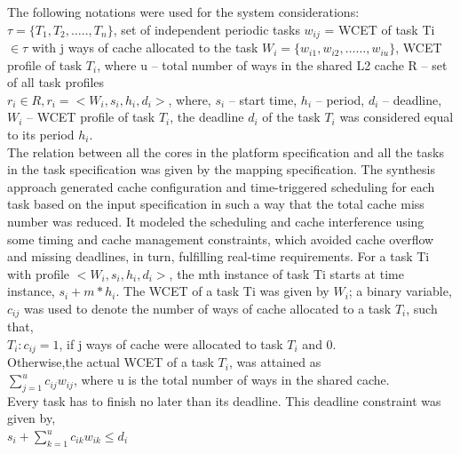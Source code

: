 \documentclass[conference]{IEEEtran}
\begin{document}
    The following notations were used for the system considerations:\\
    \newline
    $\tau = \{ T_1,  T_2, ….., T_n \}$, set of independent periodic tasks\break
    \newline
    $w_{ij}$ = WCET of task Ti $\in \tau$ with j ways of cache allocated to the task\break
    \newline
    $W_i = \{ w_{i1}, w_{i2}, ……, w_{iu} \} $,  WCET profile of task $T_i$, where u – total number of ways in the shared L2 cache\break
    \newline
    R $–$ set of all task profiles\\
    \newline
    $r_i \in R, r_i = <W_i, s_i, h_i, d_i>$, where,
    $s_i$ – start time, $h_i$ – period, $d_i$ – deadline, $W_i$ – WCET profile of task $T_i$, the deadline $d_i$ of the task $T_i$ was considered equal to its period $h_i$.\\
    \newline
    The relation between all the cores in the platform specification and all the tasks in the task specification was given by the mapping specification. The synthesis approach generated cache configuration and time-triggered scheduling for each task based on the input specification in such a way that the total cache miss number was reduced. It modeled the scheduling and cache interference using some timing and cache management constraints, which avoided cache overflow and missing deadlines, in turn, fulfilling real-time requirements. For a task Ti with profile $<W_i, s_i, h_i, d_i>$, the mth instance of task Ti starts at time instance, $s_i + m*h_i$. The WCET of a task Ti was given by $W_i$; a binary variable, $c_{ij}$ was used to denote the number of ways of cache allocated to a task $T_i$, such that,\\
    $T_i: c_{ij} = 1$, if j ways of cache were allocated to task $T_i$ and 0.\\
    Otherwise,the actual WCET of a task $T_i$, was attained as\\
    $\sum_{j=1}^{u}c_{ij}w_{ij}$, where u is the total number of ways in the shared cache.\\
    Every task has to finish no later than its deadline. This deadline constraint was given by,\\
    $s_i + \sum_{k=1}^{u} c_{ik}w_{ik} \leqslant d_i$
    
\end{document}
